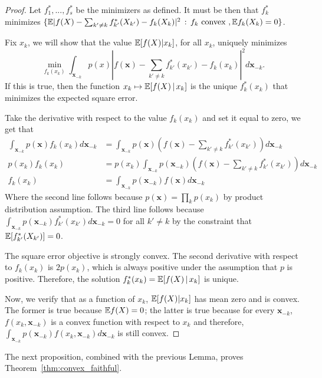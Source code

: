  \begin{proof}
 
Let $f^*_1,...,f^*_s$ be the minimizers as defined. It must be then that $f^*_k$ minimizes $\{ {\mathbb E} | f(X) - \sum_{k' \neq k} f^*_{k'} (X_{k'}) - f_k (X_k)|^2 \,:\, f_k \textrm{ convex }, {\mathbb E} f_k(X_k) = 0 \}$.

Fix $x_k$, we will show that the value ${\mathbb E}[ f(X) | x_k]$, for all $x_k$,  uniquely minimizes 
\[
\min_{ f_k(x_k) } \int_{\mathbf{x}_{-k}} p(x) | f(\mathbf{x}) - \sum_{k' \neq k} f^*_{k'} (x_{k'}) - f_k (x_k)|^2 d \mathbf{x}_{-k}.
\]
If this is true, then the function $x_k \mapsto {\mathbb E}[ f(X) {\,|\,} x_k]$ is the unique $f^*_k(x_k)$ that minimizes the expected square error.


Take the derivative with respect to the value $f_k(x_k)$ and set it equal to zero, we get that
\begin{align*}
\int_{\mathbf{x}_{-k}} p(\mathbf{x}) f_k(x_k) d \mathbf{x}_{-k} &= \int_{\mathbf{x}_{-k}} p(\mathbf{x}) ( f(\mathbf{x}) - \sum_{k' \neq k} f^*_{k'} (x_{k'}) ) d \mathbf{x}_{-k} \\  
   p(x_k) f_k(x_k) &= p(x_k) \int_{\mathbf{x}_{-k}} p(\mathbf{x}_{-k}) ( f(\mathbf{x}) - \sum_{k' \neq k} f^*_{k'} (x_{k'}) ) d \mathbf{x}_{-k} \\
f_k(x_k) &= \int_{\mathbf{x}_{-k}} p(\mathbf{x}_{-k}) f(\mathbf{x}) d \mathbf{x}_{-k} 
 \end{align*}
Where the second line follows because $p(\mathbf{x}) = \prod_k p(x_k)$ by product distribution assumption. The third line follows because $\int_{\mathbf{x}_{-k}} p(\mathbf{x}_{-k}) f^*_{k'}(x_{k'}) d\mathbf{x}_{-k} = 0$ for all $k' \neq k$ by the constraint that ${\mathbb E}[f^*_{k'}(X_{k'})] = 0$. 

The square error objective is strongly convex. The second derivative with respect to $f_k(x_k)$ is $2 p(x_k)$, which is always positive under the assumption that $p$ is positive. Therefore, the solution $f^*_k(x_k) = {\mathbb E}[ f(X) {\,|\,} x_k ]$ is unique.


Now, we verify that as a function of $x_k$, ${\mathbb E}[ f(X) | x_k]$ has mean zero and is convex. The former is true because ${\mathbb E} f(X) = 0$; the latter is true because for every $\mathbf{x}_{-k}$, $f(x_k, \mathbf{x}_{-k})$ is a convex function with respect to $x_k$ and therefore, $\int_{\mathbf{x}_{-k}} p(\mathbf{x}_{-k}) f(x_k, \mathbf{x}_{-k}) d \mathbf{x}_{-k}$ is still convex. 
 
 \end{proof}
 
 The next proposition, combined with the previous Lemma, proves Theorem~\ref{thm:convex_faithful}.
 
